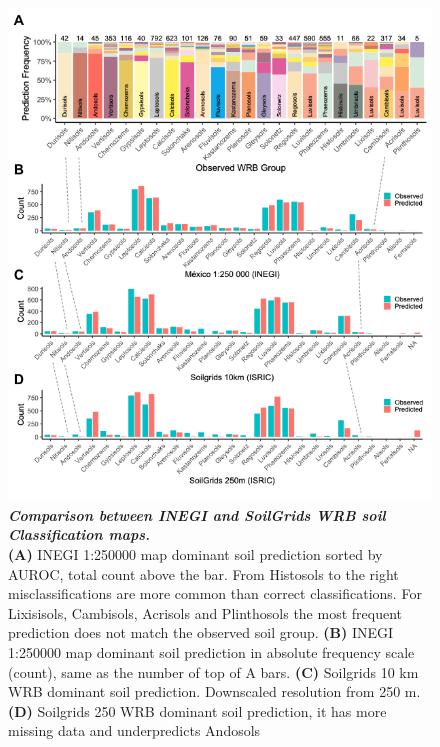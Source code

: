 \begin{figure}[!ht]
\centering
\includegraphics[width=\linewidth]{Chapter-2/figs/WRB_inegi_soilgrids}
\caption[Comparison between INEGI and SoilGrids WRB soil Classification Maps]{\textit{\textbf{Comparison between INEGI and SoilGrids WRB soil Classification maps.}} \\\hspace{\textwidth}
\textbf{(A)} INEGI 1:250000 map dominant soil prediction sorted by AUROC, total count above the bar. From Histosols to the right misclassifications are more common than correct classifications. For Lixisisols, Cambisols, Acrisols and Plinthosols the most frequent prediction does not match the observed soil group.
\textbf{(B)}  INEGI 1:250000 map dominant soil prediction in absolute frequency scale (count), same as the number of top of A bars.
\textbf{(C)} Soilgrids 10 km WRB dominant soil prediction. Downscaled resolution from 250 m.
\textbf{(D)} Soilgrids 250 WRB dominant soil prediction, it  has more missing data and underpredicts Andosols}
\label{fig::WRB_inegi2013map}
\end{figure}
\clearpage


